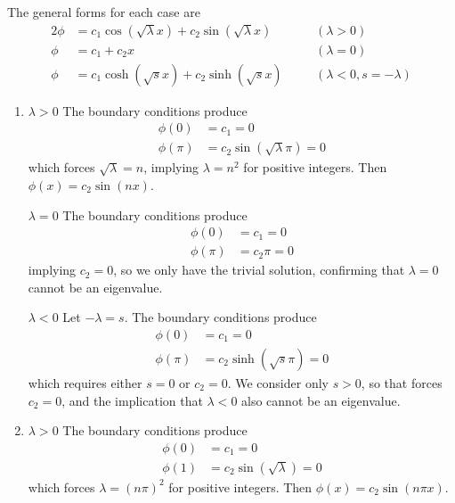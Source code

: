 \documentclass[a4paper]{article}
\begin{document}
The general forms for each case are
\begin{alignat*}{2}
	\phi & = c_{1}\cos\!\left(\sqrt{\lambda}x\right) + c_{2}\sin\!\left(\sqrt{\lambda}x\right) && \quad \!\left( \lambda > 0 \right) \\
	\phi & = c_{1} + c_{2}x && \quad \!\left( \lambda = 0 \right) \\ 
	\phi & = c_{1}\cosh\!\left( \sqrt{s}x \right) + c_{2}\sinh\!\left( \sqrt{s}x \right) && \quad \!\left( \lambda < 0, s = -\lambda \right)
\end{alignat*}

\begin{enumerate}[label=(\alph*)]
	\item \underline{\( \lambda > 0 \)}
	The boundary conditions produce
	\begin{align*}
		\phi \!\left( 0 \right) & = c_{1} = 0 \\
		\phi \!\left( \pi \right) & = c_{2}\sin\!\left(\sqrt{\lambda}\pi\right) = 0
	\end{align*}
	which forces \( \sqrt{\lambda} = n \), implying \( \lambda = n^{2} \) for positive integers. Then \( \phi \!\left( x \right) = c_{2}\sin\!\left(nx\right) \).

	\underline{\( \lambda = 0 \)}
	The boundary conditions produce
	\begin{align*}
		\phi \!\left( 0 \right) & = c_{1} = 0 \\
		\phi \!\left( \pi \right) & = c_{2}\pi = 0
	\end{align*}
	implying \( c_{2} = 0 \), so we only have the trivial solution, confirming that \( \lambda = 0 \) cannot be an eigenvalue.

	\underline{\( \lambda < 0 \)}
	Let \( -\lambda = s \). The boundary conditions produce
	\begin{align*}
		\phi \!\left( 0 \right) & = c_{1} = 0 \\
		\phi \!\left( \pi \right) & = c_{2}\sinh\!\left( \sqrt{s}\pi \right) = 0
	\end{align*}
	which requires either \( s = 0 \) or \( c_{2} = 0 \). We consider only \( s > 0 \), so that forces \( c_{2} = 0 \), and the implication that \( \lambda < 0 \) also cannot be an eigenvalue.
	\item \underline{\( \lambda > 0 \)} The boundary conditions produce
	\begin{align*}
		\phi \!\left( 0 \right) & = c_{1} = 0 \\
		\phi \!\left( 1 \right) & = c_{2}\sin\!\left(\sqrt{\lambda}\right) = 0
	\end{align*}
	which forces \( \lambda = \!\left( n \pi \right)^{2} \) for positive integers. Then \( \phi \!\left( x \right) = c_{2}\sin\!\left(n \pi x\right) \).


\end{enumerate}
\end{document}
